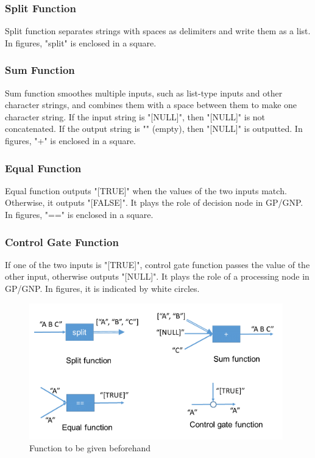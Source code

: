 \documentclass{article}
\begin{document}
\subsubsection{Split Function}
Split function separates strings with spaces as delimiters and write them as a list.
In figures, "split" is enclosed in a square.

\subsubsection{Sum Function}
Sum function smoothes multiple inputs, such as list-type inputs and other character strings, and combines them with a space between them to make one character string.
If the input string is "[NULL]", then "[NULL]" is not concatenated.
If the output string is "" (empty), then "[NULL]" is outputted.
In figures, "+" is enclosed in a square.

\subsubsection {Equal Function}
Equal function outputs "[TRUE]" when the values of the two inputs match.
Otherwise, it outputs "[FALSE]".
It plays the role of decision node in GP/GNP.
In figures, "==" is enclosed in a square.

\subsubsection {Control Gate Function}
If one of the two inputs is "[TRUE]", control gate function passes the value of the other input, otherwise outputs "[NULL]".
It plays the role of a processing node in GP/GNP.
In figures, it is indicated by white circles.

\begin{figure}[t]
\begin{center}
\includegraphics[width=110mm]{func.PNG}
\end{center}
\caption {Function to be given beforehand}
\label{fig:func}
\end{figure}
\end{document}

